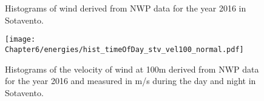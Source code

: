  \begin{figure}[t!]
   \centering
\caption{\label{fig:wind_task_def} Histograms of wind derived from NWP data for the year 2016 in Sotavento.}
\end{figure}

\begin{figure}[t!]
   \centering
   \texttt{[image: Chapter6/energies/hist\_timeOfDay\_stv\_vel100\_normal.pdf]}
 \caption{\label{fig:stv_vel100} Histograms of the velocity of wind at 100m derived from NWP data for the year 2016 and measured in m/s during the day and night in Sotavento.
}
\end{figure}

